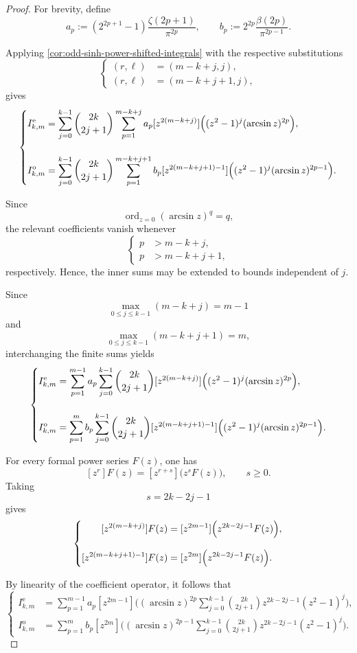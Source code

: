 \documentclass[11pt,twoside]{article}
\numberwithin{equation}{section}
\begin{document}
\begin{proof}
For brevity, define
\[
a_p
:=
\left(2^{2p+1}-1\right)
\frac{\zeta(2p+1)}{\pi^{2p}},
\qquad
b_p
:=
2^{2p}
\frac{\beta(2p)}{\pi^{2p-1}}.
\]

Applying
\cref{cor:odd-sinh-power-shifted-integrals}
with the respective substitutions
\[
\left\{
\begin{aligned}
(r,\ell)
&=
(m-k+j,j),
\\
(r,\ell)
&=
(m-k+j+1,j),
\end{aligned}
\right.
\]
gives
\[
\left\{
\begin{aligned}
I_{k,m}^{\mathrm{e}}
&=
\sum_{j=0}^{k-1}
\binom{2k}{2j+1}
\sum_{p=1}^{m-k+j}
a_p
[z^{2(m-k+j)}]
\Bigl(
(z^2-1)^j(\arcsin z)^{2p}
\Bigr),
\\[1.2em]
I_{k,m}^{\mathrm{o}}
&=
\sum_{j=0}^{k-1}
\binom{2k}{2j+1}
\sum_{p=1}^{m-k+j+1}
b_p
[z^{2(m-k+j+1)-1}]
\Bigl(
(z^2-1)^j(\arcsin z)^{2p-1}
\Bigr).
\end{aligned}
\right.
\]

Since
\[
\operatorname{ord}_{z=0}(\arcsin z)^q=q,
\]
the relevant coefficients vanish whenever
\[
\left\{
\begin{aligned}
p&>m-k+j,
\\
p&>m-k+j+1,
\end{aligned}
\right.
\]
respectively. Hence, the inner sums may be extended to bounds
independent of \(j\).

Since
\[
\max_{0\leq j\leq k-1}(m-k+j)=m-1
\]
and
\[
\max_{0\leq j\leq k-1}(m-k+j+1)=m,
\]
interchanging the finite sums yields
\[
\left\{
\begin{aligned}
I_{k,m}^{\mathrm{e}}
&=
\sum_{p=1}^{m-1}
a_p
\sum_{j=0}^{k-1}
\binom{2k}{2j+1}
[z^{2(m-k+j)}]
\Bigl(
(z^2-1)^j(\arcsin z)^{2p}
\Bigr),
\\[1.2em]
I_{k,m}^{\mathrm{o}}
&=
\sum_{p=1}^{m}
b_p
\sum_{j=0}^{k-1}
\binom{2k}{2j+1}
[z^{2(m-k+j+1)-1}]
\Bigl(
(z^2-1)^j(\arcsin z)^{2p-1}
\Bigr).
\end{aligned}
\right.
\]

For every formal power series \(F(z)\), one has
\[
[z^r]F(z)
=
[z^{r+s}]
\bigl(z^sF(z)\bigr),
\qquad s\geq0.
\]
Taking
\[
s=2k-2j-1
\]
gives
\[
\left\{
\begin{aligned}
[z^{2(m-k+j)}]F(z)
&=
[z^{2m-1}]
\Bigl(
z^{2k-2j-1}F(z)
\Bigr),
\\[0.8em]
[z^{2(m-k+j+1)-1}]F(z)
&=
[z^{2m}]
\Bigl(
z^{2k-2j-1}F(z)
\Bigr).
\end{aligned}
\right.
\]

By linearity of the coefficient operator, it follows that
\[
\left\{
\begin{aligned}
I_{k,m}^{\mathrm{e}}
&=
\sum_{p=1}^{m-1}
a_p
[z^{2m-1}]
\Biggl(
(\arcsin z)^{2p}
\sum_{j=0}^{k-1}
\binom{2k}{2j+1}
z^{2k-2j-1}(z^2-1)^j
\Biggr),
\\[1.2em]
I_{k,m}^{\mathrm{o}}
&=
\sum_{p=1}^{m}
b_p
[z^{2m}]
\Biggl(
(\arcsin z)^{2p-1}
\sum_{j=0}^{k-1}
\binom{2k}{2j+1}
z^{2k-2j-1}(z^2-1)^j
\Biggr).
\end{aligned}
\right.
\]


\end{proof}
\end{document}
